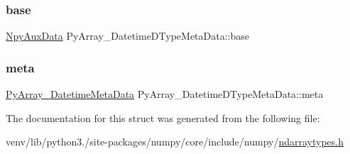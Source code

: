 \subsubsection{\texorpdfstring{base}{base}}
{\footnotesize\ttfamily \hyperlink{ndarraytypes_8h_a1f4020347b3c55cf6320697d1a3dca83}{Npy\+Aux\+Data} Py\+Array\+\_\+\+Datetime\+D\+Type\+Meta\+Data\+::base}

\mbox{\label{structPyArray__DatetimeDTypeMetaData_a51264309a5c295a3d8a1335a60c33f19}} 
\subsubsection{\texorpdfstring{meta}{meta}}
{\footnotesize\ttfamily \hyperlink{structPyArray__DatetimeMetaData}{Py\+Array\+\_\+\+Datetime\+Meta\+Data} Py\+Array\+\_\+\+Datetime\+D\+Type\+Meta\+Data\+::meta}



The documentation for this struct was generated from the following file\+:\begin{DoxyCompactItemize}
\item 
venv/lib/python3./site-\/packages/numpy/core/include/numpy/\hyperlink{ndarraytypes_8h}{ndarraytypes.\+h}\end{DoxyCompactItemize}
